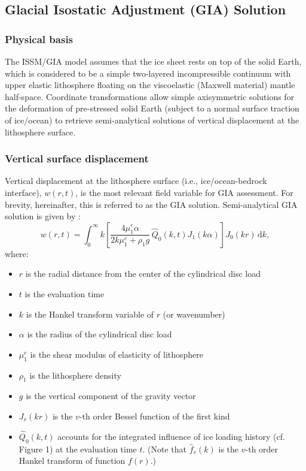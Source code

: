 
\subsection{Glacial Isostatic Adjustment (GIA) Solution} \label{sec:using-issm-capabilities-gia}

\subsubsection{Physical basis}
The ISSM/GIA model assumes that the ice sheet rests on top of the solid Earth, which is considered to be a simple two-layered incompressible continuum with upper elastic lithosphere floating on the viscoelastic (Maxwell material) mantle half-space. Coordinate transformations allow simple axisymmetric solutions for the deformation of pre-stressed solid Earth (subject to a normal surface traction of ice/ocean) to retrieve semi-analytical solutions of vertical displacement at the lithosphere surface.

\subsubsection{Vertical surface displacement}
Vertical displacement at the lithosphere surface (i.e., ice/ocean-bedrock interface), $w(r,t)$, is the most relevant field variable for GIA assessment. For brevity, hereinafter, this is referred to as the GIA solution. Semi-analytical GIA solution is given by \cite{Ivins1999}:
\begin{equation}
	w(r,t) = \int_{0}^{\infty} { k \left[ \frac{4 \mu_1^{e} \alpha}{2k\mu_1^e + \rho_1 g} \,
	\hat{Q}_0(k,t) J_1(k\alpha) \right] J_0(kr) \, \text{d}k },
\end{equation}
where:
\begin{itemize}
	\item $r$ is the radial distance from the center of the cylindrical disc load
	\item $t$ is the evaluation time
	\item $k$ is the Hankel transform variable of $r$ (or wavenumber)
	\item $\alpha$ is the radius of the cylindrical disc load
	\item $\mu_1^{e}$ is the shear modulus of elasticity of lithosphere
	\item $\rho_1$ is the lithosphere density
	\item $g$ is the vertical component of the gravity vector
	\item $J_v(kr)$ is the $v$-th order Bessel function of the first kind
	\item $\hat{Q}_0(k,t)$ accounts for the integrated influence of ice loading history
	(cf. Figure 1) at the evaluation time $t$.
	(Note that $\hat{f}_v(k)$ is the $v$-th order Hankel transform of function $f(r)$.)
\end{itemize}

